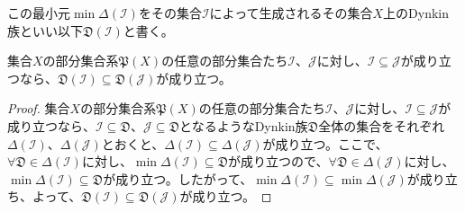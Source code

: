 \documentclass[dvipdfmx]{jsarticle}
\begin{document}
\begin{dfn}
この最小元$\min{\varDelta\left( \mathcal{I} \right)}$をその集合$\mathcal{I}$によって生成されるその集合$X$上のDynkin族といい以下$\mathfrak{D}\left( \mathcal{I} \right)$と書く。
\end{dfn}
\begin{thm}\label{4.5.6.12}
集合$X$の部分集合系$\mathfrak{P}(X)$の任意の部分集合たち$\mathcal{I}$、$\mathcal{J}$に対し、$\mathcal{I \subseteq J}$が成り立つなら、$\mathfrak{D}\left( \mathcal{I} \right) \subseteq \mathfrak{D}\left( \mathcal{J} \right)$が成り立つ。
\end{thm}
\begin{proof}
集合$X$の部分集合系$\mathfrak{P}(X)$の任意の部分集合たち$\mathcal{I}$、$\mathcal{J}$に対し、$\mathcal{I \subseteq J}$が成り立つなら、$\mathcal{I \subseteq}\mathfrak{D}$、$\mathcal{J \subseteq}\mathfrak{D}$となるようなDynkin族$\mathfrak{D}$全体の集合をそれぞれ$\varDelta\left( \mathcal{I} \right)$、$\varDelta\left( \mathcal{J} \right)$とおくと、$\varDelta\left( \mathcal{I} \right) \subseteq \varDelta\left( \mathcal{J} \right)$が成り立つ。ここで、$\mathfrak{\forall D \in}\varDelta\left( \mathcal{I} \right)$に対し、$\min{\varDelta\left( \mathcal{I} \right)}\subseteq \mathfrak{D}$が成り立つので、$\mathfrak{\forall D \in}\varDelta\left( \mathcal{J} \right)$に対し、$\min{\varDelta\left( \mathcal{I} \right)}\subseteq \mathfrak{D}$が成り立つ。したがって、$\min{\varDelta\left( \mathcal{I} \right)} \subseteq \min{\varDelta\left( \mathcal{J} \right)}$が成り立ち、よって、$\mathfrak{D}\left( \mathcal{I} \right)\subseteq \mathfrak{D}\left( \mathcal{J} \right)$が成り立つ。
\end{proof}
\end{document}
